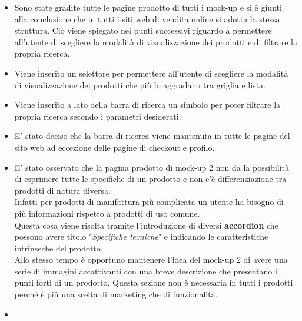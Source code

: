 \documentclass{report}
\begin{document}
\begin{itemize}
    \item {
        Sono state gradite tutte le pagine prodotto di tutti i mock-up e si è giunti alla conclusione che in tutti i siti web di vendita online si adotta la stessa struttura. Ciò viene spiegato nei punti successivi riguardo a permettere all'utente di scegliere la modalità di visualizzazione dei prodotti e di filtrare la propria ricerca.
    }
    \item {
        Viene inserito un selettore per permettere all'utente di scegliere la modalità di visualizzazione dei prodotti che più lo aggradano tra griglia e lista.
    }
    \item {
        Viene inserito a lato della barra di ricerca un simbolo per poter filtrare la propria ricerca secondo i parametri desiderati.
    }
    \item {
        E' stato deciso che la barra di ricerca viene mantenuta in tutte le pagine del sito web ad eccezione delle pagine di checkout e profilo. 
    }
\end{itemize}
\begin{itemize}
    \item {
        E' stato osservato che la pagina prodotto di mock-up 2 non da la possibilità di esprimere tutte le specifiche di un prodotto e non c'è differenziazione tra prodotti di natura diversa. \\
        Infatti per prodotti di manifattura più complicata un utente ha bisogno di più informazioni rispetto a prodotti di uso comune.\\
        Questa cosa viene risolta tramite l'introduzione di diversi \textbf{accordion} che possono avere titolo "\textit{Specifiche tecniche}" e indicando le caratteristiche intrinseche del prodotto.\\
        Allo stesso tempo è opportuno mantenere l'idea del mock-up 2 di avere una serie di immagini accattivanti con una breve descrizione che presentano i punti forti di un prodotto. Questa sezione non è necessaria in tutti i prodotti perché è più una scelta di marketing che di funzionalità. 
    }
    \item {

    }
\end{itemize}
\end{document}
